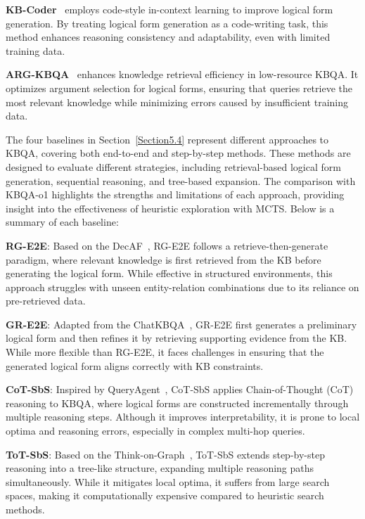 \documentclass{article}
\theoremstyle{plain}
\theoremstyle{definition}
\theoremstyle{remark}
\begin{document}
\textbf{KB-Coder}~\cite{KB-Coder} employs code-style in-context learning to improve logical form generation. By treating logical form generation as a code-writing task, this method enhances reasoning consistency and adaptability, even with limited training data.

\textbf{ARG-KBQA}~\cite{ARG-KBQA} enhances knowledge retrieval efficiency in low-resource KBQA. It optimizes argument selection for logical forms, ensuring that queries retrieve the most relevant knowledge while minimizing errors caused by insufficient training data.

The four baselines in Section~\ref{Section5.4} represent different approaches to KBQA, covering both end-to-end and step-by-step methods. These methods are designed to evaluate different strategies, including retrieval-based logical form generation, sequential reasoning, and tree-based expansion. The comparison with KBQA-o1 highlights the strengths and limitations of each approach, providing insight into the effectiveness of heuristic exploration with MCTS. Below is a summary of each baseline:

\textbf{RG-E2E}: Based on the DecAF~\cite{DecAF}, RG-E2E follows a retrieve-then-generate paradigm, where relevant knowledge is first retrieved from the KB before generating the logical form. While effective in structured environments, this approach struggles with unseen entity-relation combinations due to its reliance on pre-retrieved data.

\textbf{GR-E2E}: Adapted from the ChatKBQA~\cite{ChatKBQA}, GR-E2E first generates a preliminary logical form and then refines it by retrieving supporting evidence from the KB. While more flexible than RG-E2E, it faces challenges in ensuring that the generated logical form aligns correctly with KB constraints.

\textbf{CoT-SbS}: Inspired by QueryAgent~\cite{QueryAgent}, CoT-SbS applies Chain-of-Thought (CoT) reasoning to KBQA, where logical forms are constructed incrementally through multiple reasoning steps. Although it improves interpretability, it is prone to local optima and reasoning errors, especially in complex multi-hop queries.

\textbf{ToT-SbS}: Based on the Think-on-Graph~\cite{ToG}, ToT-SbS extends step-by-step reasoning into a tree-like structure, expanding multiple reasoning paths simultaneously. While it mitigates local optima, it suffers from large search spaces, making it computationally expensive compared to heuristic search methods.
\end{document}
